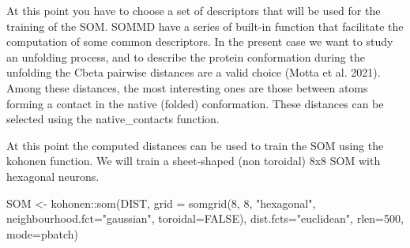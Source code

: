 \documentclass[
]{article}
\newenvironment{Shaded}{\begin{snugshade}}{\end{snugshade}}
\newcommand{\AttributeTok}[1]{\textcolor[rgb]{0.77,0.63,0.00}{#1}}
\newcommand{\CommentTok}[1]{\textcolor[rgb]{0.56,0.35,0.01}{\textit{#1}}}
\newcommand{\ConstantTok}[1]{\textcolor[rgb]{0.00,0.00,0.00}{#1}}
\newcommand{\DecValTok}[1]{\textcolor[rgb]{0.00,0.00,0.81}{#1}}
\newcommand{\FloatTok}[1]{\textcolor[rgb]{0.00,0.00,0.81}{#1}}
\newcommand{\FunctionTok}[1]{\textcolor[rgb]{0.00,0.00,0.00}{#1}}
\newcommand{\NormalTok}[1]{#1}
\newcommand{\OtherTok}[1]{\textcolor[rgb]{0.56,0.35,0.01}{#1}}
\newcommand{\SpecialCharTok}[1]{\textcolor[rgb]{0.00,0.00,0.00}{#1}}
\newcommand{\StringTok}[1]{\textcolor[rgb]{0.31,0.60,0.02}{#1}}
\begin{document}
At this point you have to choose a set of descriptors that will be used
for the training of the SOM. SOMMD have a series of built-in function
that facilitate the computation of some common descriptors. In the
present case we want to study an unfolding process, and to describe the
protein conformation during the unfolding the Cbeta pairwise distances
are a valid choice (Motta et al. 2021). Among these distances, the most
interesting ones are those between atoms forming a contact in the native
(folded) conformation. These distances can be selected using the
native\_contacts function.

\begin{Shaded}
\end{Shaded}

At this point the computed distances can be used to train the SOM using
the kohonen function. We will train a sheet-shaped (non toroidal) 8x8
SOM with hexagonal neurons.

\begin{Shaded}
\begin{Highlighting}[]
\NormalTok{SOM }\OtherTok{\textless{}{-}}\NormalTok{ kohonen}\SpecialCharTok{::}\FunctionTok{som}\NormalTok{(DIST, }\AttributeTok{grid =} \FunctionTok{somgrid}\NormalTok{(}\DecValTok{8}\NormalTok{, }\DecValTok{8}\NormalTok{, }\StringTok{"hexagonal"}\NormalTok{, }
                                         \AttributeTok{neighbourhood.fct=}\StringTok{"gaussian"}\NormalTok{, }\AttributeTok{toroidal=}\ConstantTok{FALSE}\NormalTok{), }
                    \AttributeTok{dist.fcts=}\StringTok{"euclidean"}\NormalTok{, }\AttributeTok{rlen=}\DecValTok{500}\NormalTok{, }\AttributeTok{mode=}\StringTok{\textquotesingle{}pbatch\textquotesingle{}}\NormalTok{)}
\end{Highlighting}
\end{Shaded}
\end{document}
